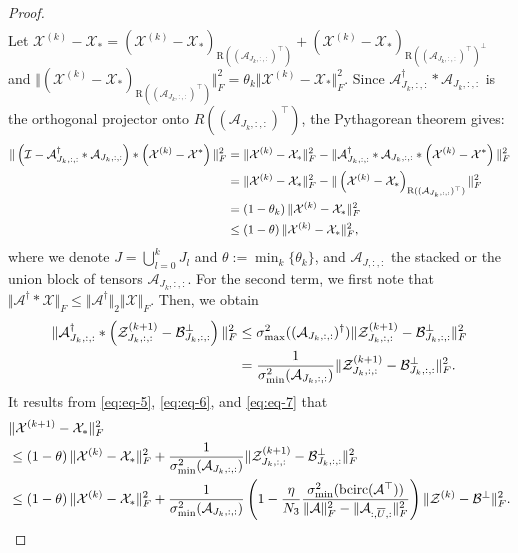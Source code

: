 \documentclass[11pt]{article}
\def\fm#1{\mathcal{#1}}
\def \a#1{\fm A_{:, #1, :}}
\def \ai#1{\fm A_{#1, :, :}}
\def \z#1#2{\fm Z^{(#1)}_{#2, :, :}}
\def \bp#1{\fm B^{\perp}_{#1, :, :}}
\def \x#1{\fm X^{(#1)}}
\begin{document}
\begin{proof}
\begin{align}
\end{align}
Let  $\x{k}-\fm X_\ast = \left( \x{k} - \fm X_\ast \right)_{\text{R}((\ai{J_k})^\top)} + \left(\x k - \fm X_\ast \right)_{\text{R}((\ai{J_k})^\top)^\perp }$ and $\Vert \left( \x{k} - \fm X_\ast \right)_{\text{R}((\ai{J_k})^\top)} \Vert_F^2  = \theta_k \Vert \x k - \fm X_\ast \Vert_F^2$. Since $\ai{J_k}^\dagger * \ai{J_k}$ is the orthogonal projector onto $R((\ai{J_k})^\top)$, the Pythagorean theorem gives:
\begin{align}
\Vert \left( \fm I - \ai{J_k}^\dagger * \ai{J_k} \right) *\left(\x k - \fm X^\ast   \right) \Vert_F^2
  & = \Vert \x k - \fm X_\ast \Vert_F^2 - \Vert \ai{J_k}^\dagger * \ai{J_k} *\left(\x k - \fm X^\ast \right) \Vert_F^2  \notag\\
  & = \Vert \x k - \fm X_\ast \Vert_F^2 - \Vert\left( \x{k} - \fm X_\ast \right)_{\text{R}((\ai{J_k})^\top)} \Vert_F^2 \notag\\
  & = \left( 1 - \theta_k \right) \Vert \x k - \fm X_\ast \Vert_F^2 \notag  \\
  & \leq \left( 1 - \theta \right) \Vert \x k - \fm X_\ast \Vert_F^2 \label{eq:eq-6},
\end{align}
where we denote $J = \bigcup_{l=0}^{k} J_l$ and $\theta:= \min_{k} \{\theta_k \}$, and $\ai{J}$ the stacked or the union block of tensors  $\ai{J_k}$. For the second term,  we first note that $\Vert \fm A^\dagger * \fm X \Vert_F \leq \Vert \fm A^\dagger \Vert_2 \Vert \fm X \Vert_F$. Then, we obtain
\begin{align}
  \Vert  \ai{J_k}^\dagger* \left(\z{k+1}{J_k} - \bp{J_k}  \right) \Vert_F^2  & \leq \sigma_{\max}^2((\ai{J_k})^\dagger) \Vert  \z{k+1}{J_k} - \bp{J_k} \Vert_F^2 \notag\\
  & = \frac{1}{\sigma_{\min}^2(\ai{J_k})} \Vert  \z{k+1}{J_k} - \bp{J_k} \Vert_F^2.
  \label{eq:eq-7}
\end{align}
It results from  \eqref{eq:eq-5}, \eqref{eq:eq-6}, and \eqref{eq:eq-7} that
\begin{align*}
 & \Vert \x{k+1} - \fm X_\ast \Vert_F^2 \\
 &  \leq \left( 1 - \theta \right) \Vert \x k - \fm X_\ast \Vert_F^2 +  \frac{1}{\sigma_{\min}^2(\ai{J_k})} \Vert  \z{k+1}{J_k} - \bp{J_k} \Vert_F^2\\
 & \leq \left( 1 - \theta \right) \Vert \x k - \fm X_\ast \Vert_F^2 + \frac{1}{\sigma_{\min}^2(\ai{J_k})} \left( 1 - \frac{\eta}{N_3}  \frac{\sigma_{\min}^2(\bcirc(\fm A^\top))}{\Vert \fm A \Vert_F^2 - \Vert \a{\overline{U}} \Vert_F^2}   \right) \Vert  \fm Z^{(k)} - \fm B^\perp \Vert_F^2 .

\end{align*}
\end{proof}
\end{document}
